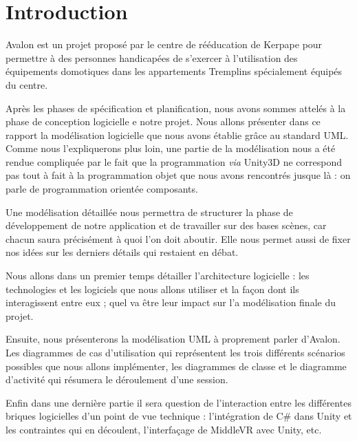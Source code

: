 \section{Introduction}
Avalon est un projet proposé par le centre de rééducation de Kerpape pour permettre à des personnes handicapées de s'exercer à l'utilisation des équipements domotiques dans les appartements Tremplins spécialement équipés du centre.\newline

Après les phases de spécification et planification, nous avons sommes attelés à la phase de conception logicielle e notre projet. Nous allons présenter dans ce rapport la modélisation logicielle que nous avons établie grâce au standard UML. Comme nous l'expliquerons plus loin, une partie de la modélisation nous a été rendue compliquée par le fait que la programmation \textit{via} Unity3D ne correspond pas tout à fait à la programmation objet que nous avons rencontrés jusque là : on parle de programmation orientée composants. \newline

Une modélisation détaillée nous permettra de structurer la phase de développement de notre application et de travailler sur des bases scènes, car chacun saura précisément à quoi l'on doit aboutir. Elle nous permet aussi de fixer nos idées sur les derniers détails qui restaient en débat. \newline

Nous allons dans un premier temps détailler l'architecture logicielle : les technologies et les logiciels que nous allons utiliser et la façon dont ils interagissent entre eux ; quel va être leur impact sur l'a modélisation finale du projet. \newline

Ensuite, nous présenterons la modélisation UML à proprement parler d'Avalon. Les diagrammes de cas d'utilisation qui représentent les trois différents scénarios possibles que nous allons implémenter, les diagrammes de classe et le diagramme d'activité qui résumera le déroulement d'une session.\newline

Enfin dans une dernière partie il sera question de l'interaction entre les différentes briques logicielles d'un point de vue technique : l'intégration de C\# dans Unity et les contraintes qui en découlent, l'interfaçage de MiddleVR avec Unity, etc. 